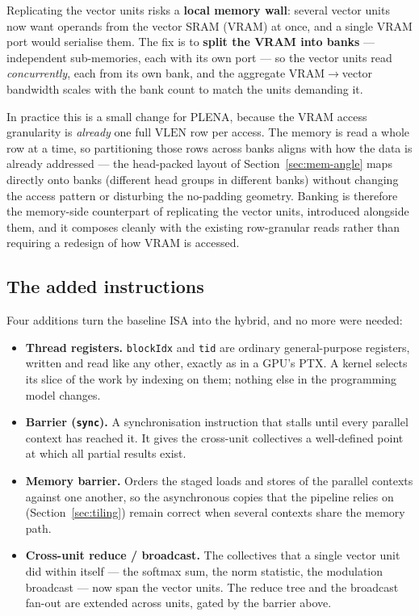 \documentclass[11pt]{report}
\begin{document}
Replicating the vector units risks a \textbf{local memory wall}: several
vector units now want operands from the vector SRAM (VRAM) at once, and a
single VRAM port would serialise them. The fix is to \textbf{split the VRAM
into banks} --- independent sub-memories, each with its own port --- so the
vector units read \emph{concurrently}, each from its own bank, and the
aggregate VRAM$\to$vector bandwidth scales with the bank count to match the
units demanding it.

In practice this is a small change for PLENA, because the VRAM access
granularity is \emph{already} one full $\text{VLEN}$ row per access. The
memory is read a whole row at a time, so partitioning those rows across banks
aligns with how the data is already addressed --- the head-packed layout of
Section~\ref{sec:mem-angle} maps directly onto banks (different head groups in
different banks) without changing the access pattern or disturbing the
no-padding geometry. Banking is therefore the memory-side counterpart of
replicating the vector units, introduced alongside them, and it composes
cleanly with the existing row-granular reads rather than requiring a redesign
of how VRAM is accessed.

\subsection{The added instructions}

Four additions turn the baseline ISA into the hybrid, and no more were
needed:

\begin{itemize}
\item \textbf{Thread registers.} \texttt{blockIdx} and \texttt{tid} are
ordinary general-purpose registers, written and read like any other, exactly
as in a GPU's PTX. A kernel selects its slice of the work by indexing on
them; nothing else in the programming model changes.
\item \textbf{Barrier (\texttt{sync}).} A synchronisation instruction that
stalls until every parallel context has reached it. It gives the cross-unit
collectives a well-defined point at which all partial results exist.
\item \textbf{Memory barrier.} Orders the staged loads and stores of the
parallel contexts against one another, so the asynchronous copies that the
pipeline relies on (Section~\ref{sec:tiling}) remain correct when several
contexts share the memory path.
\item \textbf{Cross-unit reduce / broadcast.} The collectives that a single
vector unit did within itself --- the softmax sum, the norm statistic, the
modulation broadcast --- now span the vector units. The reduce tree and the
broadcast fan-out are extended across units, gated by the barrier above.
\end{itemize}
\end{document}
